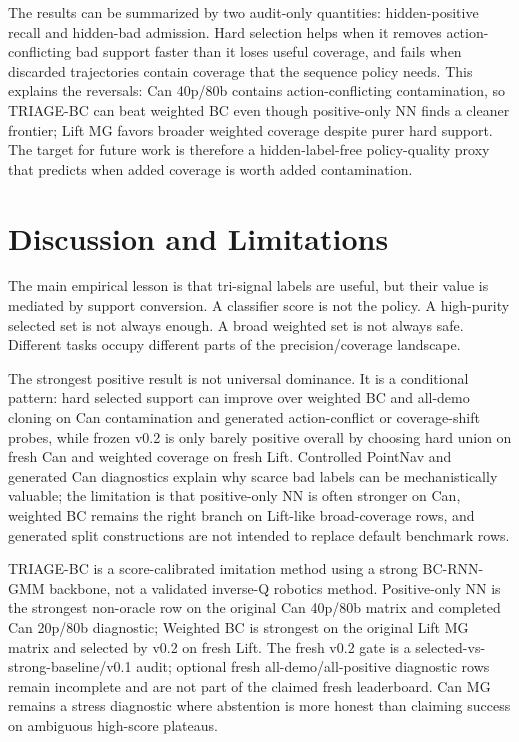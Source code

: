 \documentclass{article}
\newcommand{\method}{TRIAGE-BC}
\begin{document}
The results can be summarized by two audit-only quantities: hidden-positive recall and hidden-bad admission. Hard selection helps when it removes action-conflicting bad support faster than it loses useful coverage, and fails when discarded trajectories contain coverage that the sequence policy needs. This explains the reversals: Can 40p/80b contains action-conflicting contamination, so \method{} can beat weighted BC even though positive-only NN finds a cleaner frontier; Lift MG favors broader weighted coverage despite purer hard support. The target for future work is therefore a hidden-label-free policy-quality proxy that predicts when added coverage is worth added contamination.

\section{Discussion and Limitations}

The main empirical lesson is that tri-signal labels are useful, but their value is mediated by support conversion. A classifier score is not the policy. A high-purity selected set is not always enough. A broad weighted set is not always safe. Different tasks occupy different parts of the precision/coverage landscape.

The strongest positive result is not universal dominance. It is a conditional pattern: hard selected support can improve over weighted BC and all-demo cloning on Can contamination and generated action-conflict or coverage-shift probes, while frozen v0.2 is only barely positive overall by choosing hard union on fresh Can and weighted coverage on fresh Lift. Controlled PointNav and generated Can diagnostics explain why scarce bad labels can be mechanistically valuable; the limitation is that positive-only NN is often stronger on Can, weighted BC remains the right branch on Lift-like broad-coverage rows, and generated split constructions are not intended to replace default benchmark rows.

TRIAGE-BC is a score-calibrated imitation method using a strong BC-RNN-GMM backbone, not a validated inverse-Q robotics method. Positive-only NN is the strongest non-oracle row on the original Can 40p/80b matrix and completed Can 20p/80b diagnostic; Weighted BC is strongest on the original Lift MG matrix and selected by v0.2 on fresh Lift. The fresh v0.2 gate is a selected-vs-strong-baseline/v0.1 audit; optional fresh all-demo/all-positive diagnostic rows remain incomplete and are not part of the claimed fresh leaderboard. Can MG remains a stress diagnostic where abstention is more honest than claiming success on ambiguous high-score plateaus.
\end{document}
